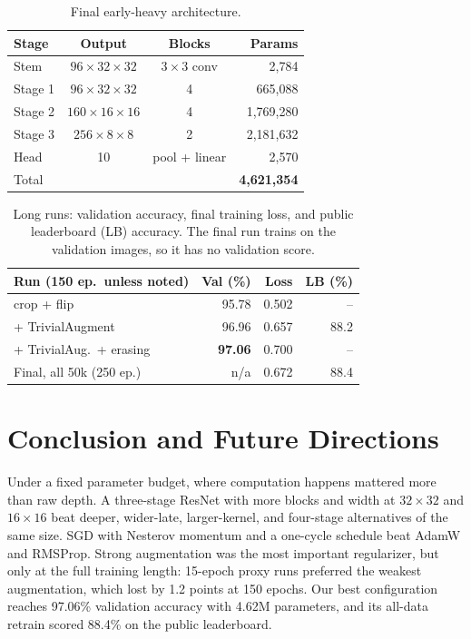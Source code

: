 \documentclass[letterpaper]{article} %
\begin{document}
\begin{table}[t]
\centering
\small
\setlength{\tabcolsep}{3pt}
\begin{tabular}{lccr}
\toprule
Stage & Output & Blocks & Params \\
\midrule
Stem    & $96{\times}32{\times}32$  & $3{\times}3$ conv & 2,784 \\
Stage 1 & $96{\times}32{\times}32$  & 4 & 665,088 \\
Stage 2 & $160{\times}16{\times}16$ & 4 & 1,769,280 \\
Stage 3 & $256{\times}8{\times}8$   & 2 & 2,181,632 \\
Head    & 10 & pool + linear & 2,570 \\
\midrule
Total   & & & \textbf{4,621,354} \\
\bottomrule
\end{tabular}
\caption{Final early-heavy architecture.}
\label{tab:model}
\end{table}

\begin{table}[t]
\centering
\small
\setlength{\tabcolsep}{3pt}
\begin{tabular}{lrrr}
\toprule
Run (150 ep.\ unless noted) & Val (\%) & Loss & LB (\%) \\
\midrule
crop + flip                 & 95.78 & 0.502 & -- \\
+ TrivialAugment            & 96.96 & 0.657 & 88.2 \\
+ TrivialAug.\ + erasing    & \textbf{97.06} & 0.700 & -- \\
Final, all 50k (250 ep.)    & n/a   & 0.672 & 88.4 \\
\bottomrule
\end{tabular}
\caption{Long runs: validation accuracy, final training loss, and public leaderboard (LB) accuracy. The final run trains on the validation images, so it has no validation score.}
\label{tab:final}
\end{table}

\section{Conclusion and Future Directions}

Under a fixed parameter budget, where computation happens mattered more than raw depth. A three-stage ResNet with more blocks and width at $32\times32$ and $16\times16$ beat deeper, wider-late, larger-kernel, and four-stage alternatives of the same size. SGD with Nesterov momentum and a one-cycle schedule beat AdamW and RMSProp. Strong augmentation was the most important regularizer, but only at the full training length: 15-epoch proxy runs preferred the weakest augmentation, which lost by 1.2 points at 150 epochs. Our best configuration reaches 97.06\% validation accuracy with 4.62M parameters, and its all-data retrain scored 88.4\% on the public leaderboard.
\end{document}
